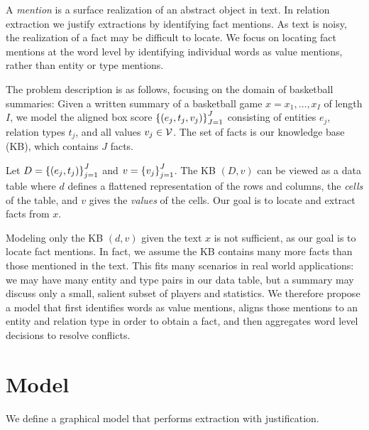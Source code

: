 \documentclass[12pt]{article}
\begin{document}
A \textit{mention} is a surface realization of an abstract object in text.
In relation extraction we justify extractions by identifying fact mentions.
As text is noisy, the realization of a fact may be difficult to locate.
We focus on locating fact mentions at the word level by identifying
individual words as value mentions, rather than entity or type mentions.

\begin{comment}
Note on related work:
Except for \citet{zeng2018copy}, prior work has either assumed that the locations of
entities and values are given as input features or that the locations of entities and values
are observed at training time.
\end{comment}

The problem description is as follows, focusing on the domain of basketball summaries:
Given a written summary of a basketball game $x = x_1, \ldots, x_{I}$
of length $I$,
we model the aligned box score $\left\{(e_j, t_j, v_j)\right\}_{J=1}^J$
consisting of entities $e_j$,
relation types $t_j$, and all values $v_j \in \mathcal{V}$.
The set of facts is our knowledge base (KB), which contains $J$ facts.

Let $D = \left\{(e_j, t_j)\right\}_{j=1}^J$ and $v = \left\{v_j\right\}_{j=1}^J$.
The KB $(D,v)$ can be viewed as a data table where
$d$ defines a flattened representation of the rows and columns,
the \textit{cells} of the table, and
$v$ gives the \textit{values} of the cells.
Our goal is to locate and extract facts from $x$.


Modeling only the KB $(d,v)$ given the text $x$
is not sufficient, as our goal is to locate fact mentions.
In fact, we assume the KB contains many more facts than those mentioned in the text.
This fits many scenarios in real world applications:
we may have many entity and type pairs in our data table,
but a summary may discuss only a small, salient subset of players and statistics.
We therefore propose a model that first identifies words as value mentions,
aligns those mentions to an entity and relation type in order to obtain a fact, 
and then aggregates word level decisions to resolve conflicts.

\section{Model}
We define a graphical model that performs extraction with justification.
\end{document}
